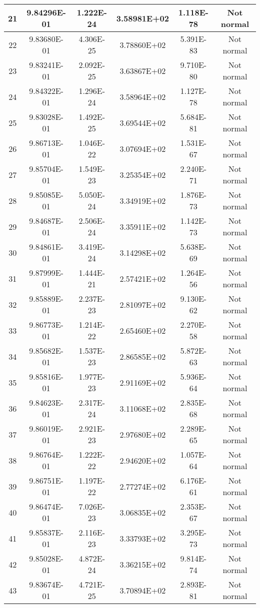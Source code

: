 \begin{table}[h]
\begin{tabular}{|c|c|c|c|c|c|}
		21 & 9.84296E-01 & 1.222E-24 & 3.58981E+02 & 1.118E-78 & Not normal\\\hline
		22 & 9.83680E-01 & 4.306E-25 & 3.78860E+02 & 5.391E-83 & Not normal\\\hline
		23 & 9.83241E-01 & 2.092E-25 & 3.63867E+02 & 9.710E-80 & Not normal\\\hline
		24 & 9.84322E-01 & 1.296E-24 & 3.58964E+02 & 1.127E-78 & Not normal\\\hline
		25 & 9.83028E-01 & 1.492E-25 & 3.69544E+02 & 5.684E-81 & Not normal\\\hline
		26 & 9.86713E-01 & 1.046E-22 & 3.07694E+02 & 1.531E-67 & Not normal\\\hline
		27 & 9.85704E-01 & 1.549E-23 & 3.25354E+02 & 2.240E-71 & Not normal\\\hline
		28 & 9.85085E-01 & 5.050E-24 & 3.34919E+02 & 1.876E-73 & Not normal\\\hline
		29 & 9.84687E-01 & 2.506E-24 & 3.35911E+02 & 1.142E-73 & Not normal\\\hline
		30 & 9.84861E-01 & 3.419E-24 & 3.14298E+02 & 5.638E-69 & Not normal\\\hline
		31 & 9.87999E-01 & 1.444E-21 & 2.57421E+02 & 1.264E-56 & Not normal\\\hline
		32 & 9.85889E-01 & 2.237E-23 & 2.81097E+02 & 9.130E-62 & Not normal\\\hline
		33 & 9.86773E-01 & 1.214E-22 & 2.65460E+02 & 2.270E-58 & Not normal\\\hline
		34 & 9.85682E-01 & 1.537E-23 & 2.86585E+02 & 5.872E-63 & Not normal\\\hline
		35 & 9.85816E-01 & 1.977E-23 & 2.91169E+02 & 5.936E-64 & Not normal\\\hline
		36 & 9.84623E-01 & 2.317E-24 & 3.11068E+02 & 2.835E-68 & Not normal\\\hline
		37 & 9.86019E-01 & 2.921E-23 & 2.97680E+02 & 2.289E-65 & Not normal\\\hline
		38 & 9.86764E-01 & 1.222E-22 & 2.94620E+02 & 1.057E-64 & Not normal\\\hline
		39 & 9.86751E-01 & 1.197E-22 & 2.77274E+02 & 6.176E-61 & Not normal\\\hline
		40 & 9.86474E-01 & 7.026E-23 & 3.06835E+02 & 2.353E-67 & Not normal\\\hline
		41 & 9.85837E-01 & 2.116E-23 & 3.33793E+02 & 3.295E-73 & Not normal\\\hline
		42 & 9.85028E-01 & 4.872E-24 & 3.36215E+02 & 9.814E-74 & Not normal\\\hline
		43 & 9.83674E-01 & 4.721E-25 & 3.70894E+02 & 2.893E-81 & Not normal\\\hline

\end{tabular}
\end{table}
